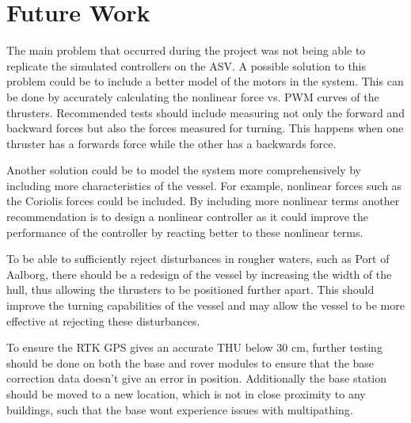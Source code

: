 \chapter{Future Work}

The main problem that occurred during the project was not being able to replicate the simulated controllers on the ASV. A possible solution to this problem could be to include a better model of the motors in the system. This can be done by accurately calculating the nonlinear force vs. PWM curves of the thrusters. Recommended tests should include measuring not only the forward and backward forces but also the forces measured for turning. This happens when one thruster has a forwards force while the other has a backwards force.

Another solution could be to model the system more comprehensively by including more characteristics of the vessel. For example, nonlinear forces such as the Coriolis forces could be included. By including more nonlinear terms another recommendation is to design a nonlinear controller as it could improve the performance of the controller by reacting better to these nonlinear terms.

To be able to sufficiently reject disturbances in rougher waters, such as Port of Aalborg, there should be a redesign of the vessel by increasing the width of the hull, thus allowing the thrusters to be positioned further apart. This should improve the turning capabilities of the vessel and may allow the vessel to be more effective at rejecting these disturbances.

To ensure the RTK GPS gives an accurate THU below 30 cm, further testing should be done on both the base and rover modules to ensure that the base correction data doesn't give an error in position.
Additionally the base station should be moved to a new location, which is not in close proximity to any buildings, such that the base wont experience issues with multipathing.


% 

